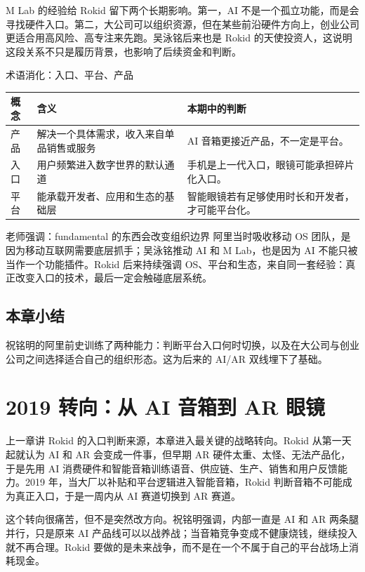 \documentclass[a4paper]{article}
\begin{document}
M Lab 的经验给 Rokid 留下两个长期影响。第一，AI 不是一个孤立功能，而是会寻找硬件入口。第二，大公司可以组织资源，但在某些前沿硬件方向上，创业公司更适合用高风险、高专注来先跑。吴泳铭后来也是 Rokid 的天使投资人，这说明这段关系不只是履历背景，也影响了后续资金和判断。

\begin{knowledgebox}{术语消化：入口、平台、产品}
\noindent\begin{tabularx}{\textwidth}{p{}p{}X}
\toprule
概念 & 含义 & 本期中的判断 \\
\midrule
产品 & 解决一个具体需求，收入来自单品销售或服务 & AI 音箱更接近产品，不一定是平台。 \\
入口 & 用户频繁进入数字世界的默认通道 & 手机是上一代入口，眼镜可能承担碎片化入口。 \\
平台 & 能承载开发者、应用和生态的基础层 & 智能眼镜若有足够使用时长和开发者，才可能平台化。 \\
\bottomrule
\end{tabularx}
\end{knowledgebox}

\begin{importantbox}{老师强调：fundamental 的东西会改变组织边界}
阿里当时吸收移动 OS 团队，是因为移动互联网需要底层抓手；吴泳铭推动 AI 和 M Lab，也是因为 AI 不能只被当作一个功能插件。Rokid 后来持续强调 OS、平台和生态，来自同一套经验：真正改变入口的技术，最后一定会触碰底层系统。
\end{importantbox}

\subsection{本章小结}

祝铭明的阿里前史训练了两种能力：判断平台入口何时切换，以及在大公司与创业公司之间选择适合自己的组织形态。这为后来的 AI/AR 双线埋下了基础。

\section{2019 转向：从 AI 音箱到 AR 眼镜}

上一章讲 Rokid 的入口判断来源，本章进入最关键的战略转向。Rokid 从第一天起就认为 AI 和 AR 会变成一件事，但早期 AR 硬件太重、太怪、无法产品化，于是先用 AI 消费硬件和智能音箱训练语音、供应链、生产、销售和用户反馈能力。2019 年，当大厂以补贴和平台逻辑进入智能音箱，Rokid 判断音箱不可能成为真正入口，于是一周内从 AI 赛道切换到 AR 赛道。

这个转向很痛苦，但不是突然改方向。祝铭明强调，内部一直是 AI 和 AR 两条腿并行，只是原来 AI 产品线可以以战养战；当音箱竞争变成不健康烧钱，继续投入就不再合理。Rokid 要做的是未来战争，而不是在一个不属于自己的平台战场上消耗现金。
\end{document}
